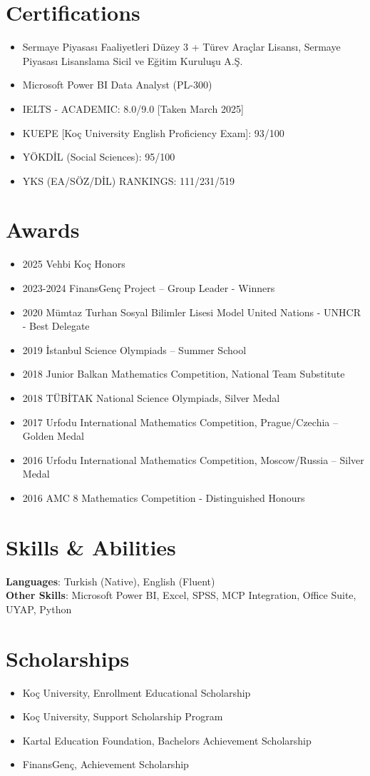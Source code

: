\documentclass[letterpaper,11pt]{article}
\newcommand{\resumeItem}[1]{\item\small{{
    {#1 \vspace{-2pt}}
  }}}
\newcommand{\resumeItemListStart}{\begin{itemize}[parsep=0pt]}
\newcommand{\resumeItemListEnd}{\end{itemize}\vspace{-27pt}}
\begin{document}
\section{Certifications}
\resumeItemListStart
    \resumeItem{Sermaye Piyasası Faaliyetleri Düzey 3 + Türev Araçlar Lisansı, Sermaye Piyasası Lisanslama Sicil ve Eğitim Kuruluşu A.Ş.}
    \resumeItem{Microsoft Power BI Data Analyst (PL-300)}
    \resumeItem{IELTS - ACADEMIC: 8.0/9.0 [Taken March 2025]}
    \resumeItem{KUEPE [Koç University English Proficiency Exam]: 93/100}
    \resumeItem{YÖKDİL (Social Sciences): 95/100}
    \resumeItem{YKS (EA/SÖZ/DİL) RANKINGS: 111/231/519}
\resumeItemListEnd

\section{Awards}
\resumeItemListStart
    \resumeItem{2025 Vehbi Koç Honors}
    \resumeItem{2023-2024 FinansGenç Project – Group Leader - Winners}
    \resumeItem{2020 Mümtaz Turhan Sosyal Bilimler Lisesi Model United Nations - UNHCR - Best Delegate}
    \resumeItem{2019 İstanbul Science Olympiads – Summer School}
    \resumeItem{2018 Junior Balkan Mathematics Competition, National Team Substitute}
    \resumeItem{2018 TÜBİTAK National Science Olympiads, Silver Medal}
    \resumeItem{2017 Urfodu International Mathematics Competition, Prague/Czechia – Golden Medal}
    \resumeItem{2016 Urfodu International Mathematics Competition, Moscow/Russia – Silver Medal}
    \resumeItem{2016 AMC 8 Mathematics Competition - Distinguished Honours}
\resumeItemListEnd

\section{Skills \& Abilities}
 \begin{itemize}[leftmargin=0.15in, label={}]
    \small{\item{
     \textbf{Languages}{: Turkish (Native), English (Fluent)} \\
     \textbf{Other Skills}{: Microsoft Power BI, Excel, SPSS, MCP Integration, Office Suite, UYAP, Python}
    }}
 \end{itemize}\vspace{-27pt}

\section{Scholarships}
\resumeItemListStart
    \resumeItem{Koç University, Enrollment Educational Scholarship}
    \resumeItem{Koç University, Support Scholarship Program}
    \resumeItem{Kartal Education Foundation, Bachelors Achievement Scholarship}
    \resumeItem{FinansGenç, Achievement Scholarship}
\resumeItemListEnd

\end{document}
